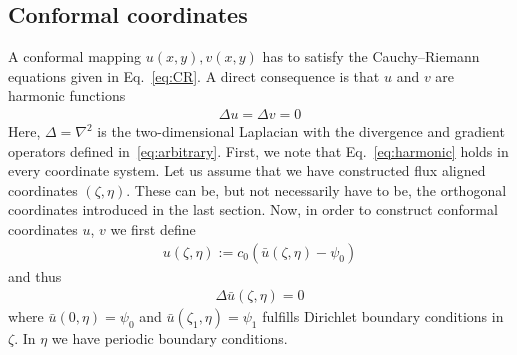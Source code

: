 \documentclass{hitec} %
\begin{document}
\subsection{Conformal coordinates} \label{sec:conformal}
A conformal mapping $u(x,y), v(x,y)$ has to satisfy the Cauchy--Riemann equations given in Eq.~\eqref{eq:CR}.
A direct consequence is that $u$ and $v$ are harmonic functions 
\begin{align}
  \Delta u = \Delta v = 0
  \label{eq:harmonic}
\end{align}
Here, $\Delta=\nabla^2$ is the two-dimensional Laplacian with the divergence
and gradient operators defined in~\eqref{eq:arbitrary}.
First, we note that Eq.~\eqref{eq:harmonic} holds in every coordinate system.
Let us assume that we have constructed flux aligned  coordinates $(\zeta, \eta)$. These can be, but not necessarily have to be,
the orthogonal coordinates introduced in the last section. 
Now, in order to construct conformal coordinates $u$, $v$ we first define 
\begin{align}
u(\zeta,\eta):=c_0(\bar u(\zeta,\eta)-\psi_0)
  \label{eq:ubar}
\end{align}
and thus
\begin{align}
  \Delta \bar u(\zeta,\eta) = 0 %
  \label{eq:ubar_harmonic}
\end{align}
where $\bar u( 0, \eta) = \psi_0$ and $\bar u( \zeta_1, \eta) =\psi_1$ fulfills Dirichlet boundary conditions in $\zeta$. 
In $\eta$ we have periodic boundary conditions. 
\end{document}
